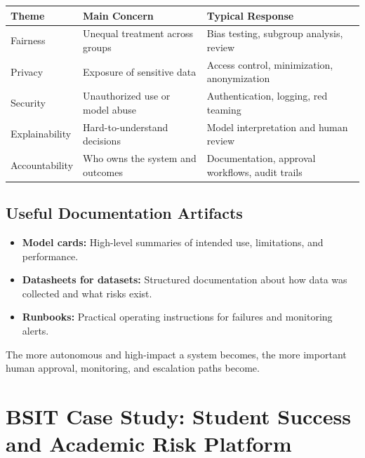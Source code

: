 \documentclass[11pt,a4paper]{article}
\begin{document}
\begin{longtable}{@{}p{3.1cm}p{4.1cm}p{5.8cm}@{}}
\toprule
\rowcolor{primary!15}
\textbf{Theme} & \textbf{Main Concern} & \textbf{Typical Response} \\
\midrule
\endhead
Fairness & Unequal treatment across groups & Bias testing, subgroup analysis, review \\
\addlinespace
Privacy & Exposure of sensitive data & Access control, minimization, anonymization \\
\addlinespace
Security & Unauthorized use or model abuse & Authentication, logging, red teaming \\
\addlinespace
Explainability & Hard-to-understand decisions & Model interpretation and human review \\
\addlinespace
Accountability & Who owns the system and outcomes & Documentation, approval workflows, audit trails \\
\bottomrule
\end{longtable}

\subsection{Useful Documentation Artifacts}

\begin{itemize}[leftmargin=*]
  \item \textbf{Model cards:} High-level summaries of intended use, limitations, and performance.
  \item \textbf{Datasheets for datasets:} Structured documentation about how data was collected and what risks exist.
  \item \textbf{Runbooks:} Practical operating instructions for failures and monitoring alerts.
\end{itemize}

\begin{alertbox}
The more autonomous and high-impact a system becomes, the more important human approval, monitoring, and escalation paths become.
\end{alertbox}

\section{BSIT Case Study: Student Success and Academic Risk Platform}
\end{document}
